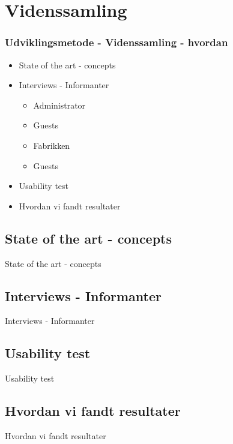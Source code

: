 \section{Videnssamling}
\begin{frame}
	\frametitle{Udviklingsmetode - Videnssamling - hvordan}
	\begin{itemize}
		\item State of the art - concepts
		\item Interviews - Informanter
		\begin{itemize}
			\item Administrator
			\item Guests
			\item Fabrikken
			\item Guests
		\end{itemize}
		\item Usability test
		\item Hvordan vi fandt resultater
	\end{itemize}
\end{frame}

\subsection{State of the art - concepts}
\begin{frame}{State of the art - concepts}
\end{frame}
\subsection{Interviews - Informanter}
\begin{frame}{Interviews - Informanter}
\end{frame}
\subsection{Usability test}
\begin{frame}{Usability test}
\end{frame}
\subsection{Hvordan vi fandt resultater}
\begin{frame}{Hvordan vi fandt resultater}
\end{frame}
